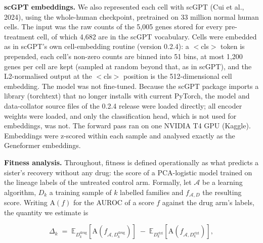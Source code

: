 \documentclass[11pt,a4paper]{article}
\begin{document}
\textbf{scGPT embeddings.} We also represented each cell with scGPT (Cui et al., 2024), using the whole-human checkpoint, pretrained on 33 million normal human cells. The input was the raw counts of the 5,005 genes stored for every pre-treatment cell, of which 4,682 are in the scGPT vocabulary. Cells were embedded as in scGPT's own cell-embedding routine (version 0.2.4): a $<$cls$>$ token is prepended, each cell's non-zero counts are binned into 51 bins, at most 1,200 genes per cell are kept (sampled at random beyond that, as in scGPT), and the L2-normalised output at the $<$cls$>$ position is the 512-dimensional cell embedding. The model was not fine-tuned. Because the scGPT package imports a library (torchtext) that no longer installs with current PyTorch, the model and data-collator source files of the 0.2.4 release were loaded directly; all encoder weights were loaded, and only the classification head, which is not used for embeddings, was not. The forward pass ran on one NVIDIA T4 GPU (Kaggle). Embeddings were z-scored within each sample and analysed exactly as the Geneformer embeddings.

\textbf{Fitness analysis.} Throughout, fitness is defined operationally as what predicts a sister's recovery without any drug: the score of a PCA-logistic model trained on the lineage labels of the untreated control arm. Formally, let $\mathcal{A}$ be a learning algorithm, $D_k$ a training sample of $k$ labelled families and $f_{\mathcal{A}, D}$ the resulting score. Writing $\mathrm{A}(f)$ for the AUROC of a score $f$ against the drug arm's labels, the quantity we estimate is

\begin{equation}
\Delta_k \;=\; \mathbb{E}_{D_k^{\text{drug}}}\!\left[\mathrm{A}\!\left(f_{\mathcal{A}, D_k^{\text{drug}}}\right)\right] \;-\; \mathbb{E}_{D_k^{\text{ctrl}}}\!\left[\mathrm{A}\!\left(f_{\mathcal{A}, D_k^{\text{ctrl}}}\right)\right],
\end{equation}
\end{document}
